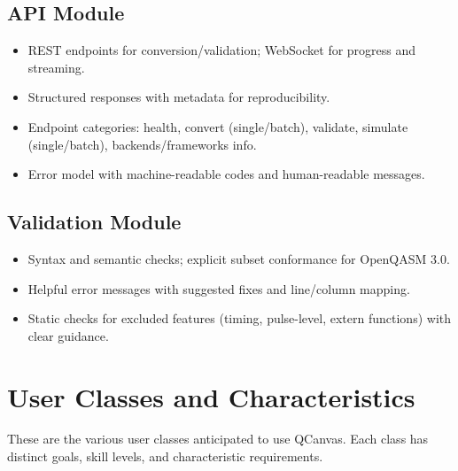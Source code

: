\subsection{API Module}
\begin{itemize}
    \item REST endpoints for conversion/validation; WebSocket for progress and streaming.
    \item Structured responses with metadata for reproducibility.
    \item Endpoint categories: health, convert (single/batch), validate, simulate (single/batch), backends/frameworks info.
    \item Error model with machine-readable codes and human-readable messages.
\end{itemize}

\subsection{Validation Module}
\begin{itemize}
    \item Syntax and semantic checks; explicit subset conformance for OpenQASM 3.0.
    \item Helpful error messages with suggested fixes and line/column mapping.
    \item Static checks for excluded features (timing, pulse-level, extern functions) with clear guidance.
\end{itemize}

\clearpage

\section{User Classes and Characteristics}

These are the various user classes anticipated to use QCanvas. Each class has distinct goals, skill levels, and characteristic requirements.

